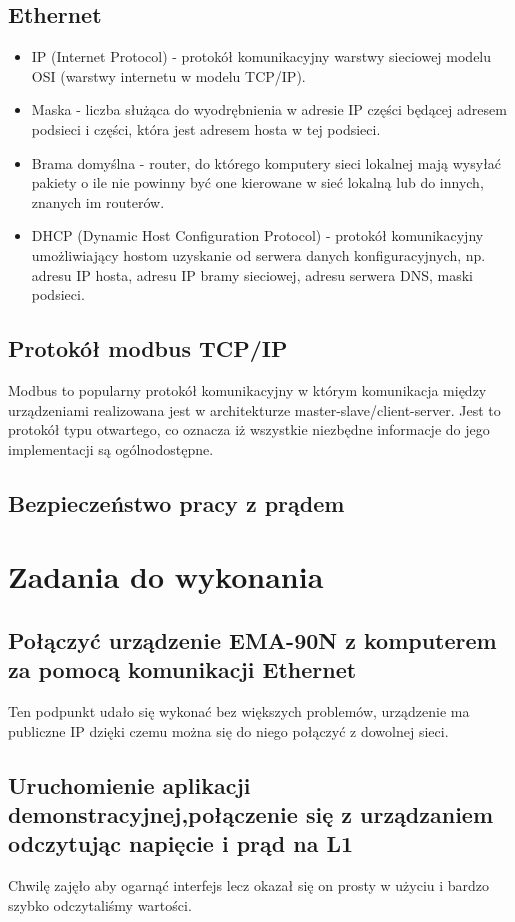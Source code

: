 \documentclass[a4paper,12pt]{extarticle}  %
\begin{document}
\subsection{Ethernet}
\begin{itemize}
	\item IP (Internet Protocol) - protokół komunikacyjny warstwy sieciowej modelu OSI (warstwy internetu w modelu TCP/IP).
	\item Maska - liczba służąca do wyodrębnienia w adresie IP części będącej adresem podsieci i części, która jest adresem hosta w tej podsieci. 
	\item Brama domyślna - router, do którego komputery sieci lokalnej mają wysyłać pakiety o ile nie powinny być one kierowane w sieć lokalną lub do innych, znanych im routerów.
	\item DHCP (Dynamic Host Configuration Protocol) - protokół komunikacyjny umożliwiający hostom uzyskanie od serwera danych konfiguracyjnych, np. adresu IP hosta, adresu IP bramy sieciowej, adresu serwera DNS, maski podsieci.
\end{itemize}
\subsection{Protokół modbus TCP/IP}
Modbus to popularny protokół komunikacyjny w którym komunikacja między urządzeniami realizowana jest w architekturze master-slave/client-server. 
Jest to protokół typu otwartego, co oznacza iż wszystkie niezbędne informacje do jego implementacji są ogólnodostępne.
\subsection{Bezpieczeństwo pracy z prądem}

\section{Zadania do wykonania}
\subsection{Połączyć urządzenie EMA-90N z komputerem za pomocą komunikacji Ethernet}
Ten podpunkt udało się wykonać bez większych problemów, urządzenie ma publiczne IP dzięki czemu można się do niego połączyć z dowolnej sieci.
\subsection{Uruchomienie aplikacji demonstracyjnej,połączenie się z urządzaniem odczytując napięcie i prąd na L1}
Chwilę zajęło aby ogarnąć interfejs lecz okazał się on prosty w użyciu i bardzo szybko odczytaliśmy wartości.
\end{document}
